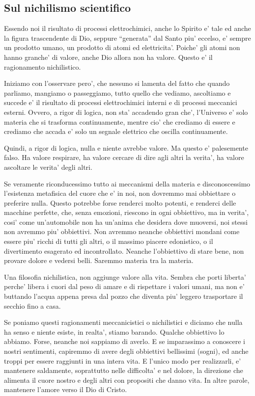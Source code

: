 \subsection{Sul nichilismo scientifico}
\label{sulNichilismoScientifico}

Essendo noi il risultato di processi elettrochimici, anche lo Spirito e' tale ed anche la figura trascendente di Dio, seppure ``generata'' dal Santo piu' eccelso, e' sempre un prodotto umano, un prodotto di atomi ed elettricita'. Poiche' gli atomi non hanno granche' di valore, anche Dio allora non ha valore. Questo e' il ragionamento nichilistico.

Iniziamo con l'osservare pero', che nessuno si lamenta del fatto che quando parliamo, mangiamo o passeggiamo, tutto quello che vediamo, ascoltiamo e succede e' il risultato di processi elettrochimici interni e di processi meccanici esterni. Ovvero, a rigor di logica, non sta' accadendo gran che', l'Universo e' solo materia che si trasforma continuamente, mentre cio' che crediamo di essere e crediamo che accada e' solo un segnale elettrico che oscilla continuamente.

Quindi, a rigor di logica, nulla e niente avrebbe valore. Ma questo e' palesemente falso. Ha valore respirare, ha valore cercare di dire agli altri la verita', ha valore ascoltare le verita' degli altri.

Se veramente riconducessimo tutto ai meccanismi della materia e disconoscessimo l'esistenza metafisica del cuore che e' in noi, non dovremmo mai obbiettare o preferire nulla. 
Questo potrebbe forse renderci molto potenti, e renderci delle macchine perfette, che, senza emozioni, riescono in ogni obbiettivo, ma in verita', cosi' come un'automobile non ha un'anima che desidera dove muoversi, noi stessi non avremmo piu' obbiettivi. Non avremmo neanche obbiettivi mondani come essere piu' ricchi di tutti gli altri, o il massimo piacere edonistico, o il divertimento esagerato ed incontrollato. Neanche l'obbiettivo di stare bene, non provare dolore e vedersi belli. Saremmo materia tra la materia.

Una filosofia nichilistica, non aggiunge valore alla vita. Sembra che porti liberta' perche' libera i cuori dal peso di amare e di rispettare i valori umani, ma non e' buttando l'acqua appena presa dal pozzo che diventa piu' leggero trasportare il secchio fino a casa.

Se poniamo questi ragionamenti meccanicistici o nichilistici e diciamo che nulla ha senso e niente esiste, in realta', stiamo barando. Qualche obbiettivo lo abbiamo. Forse, neanche noi sappiamo di averlo. E se imparassimo a conoscere i nostri sentimenti, capiremmo di avere degli obbiettivi bellissimi (sogni), ed anche troppi per essere raggiunti in una intera vita. E l'unico modo per realizzarli, e' mantenere saldamente, soprattutto nelle difficolta' e nel dolore, la direzione che alimenta il cuore nostro e degli altri con propositi che danno vita. In altre parole, mantenere l'amore verso il Dio di Cristo.


